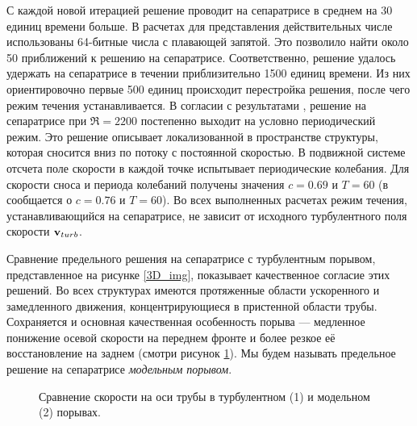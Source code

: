 С каждой новой итерацией решение проводит на сепаратрисе в среднем на 30 единиц времени больше. В расчетах для представления действительных числе использованы 64-битные числа с плавающей запятой. Это позволило найти около 50 приближений к решению на сепаратрисе. Соответственно, решение удалось удержать на сепаратрисе в течении приблизительно 1500 единиц времени. Из них ориентировочно первые 500 единиц происходит перестройка решения, после чего режим течения устанавливается. В согласии с результатами \cite{Avila2013}, решение на сепаратрисе при $\Re=2200$ постепенно выходит на условно периодический режим. Это решение описывает локализованной в пространстве структуры, которая сносится вниз по потоку с постоянной скоростью. В подвижной системе отсчета поле скорости в каждой точке испытывает периодические колебания. Для скорости сноса и периода колебаний получены значения $c=0.69$ и $T=60$ (в \cite{Avila2013} сообщается о $c=0.76$ и $T=60$). Во всех выполненных расчетах режим течения, устанавливающийся на сепаратрисе, не зависит от исходного турбулентного поля скорости $\mathbf{v}_{turb}$. 

\begin{comment}
Так как скорость сноса модельного порыва заранее не известна, решение на сепаратрисе было найдено в системе отсчета, двигающейся со скоростью $0.5$. После того, как решение на сепаратрисе найдено, изменить скорость перемещения системы отсчета уже не представляется возможным вследствие высокой чувствительности решения к возмущениям, возникающим в данном случае в результате неточностей численного интегрирования. Чтобы получить решение в сопутствующей системе отсчета, метод поиска решения на сепаратрисе применен повторно в системе отсчета, двигающейся с уже известной скоростью перемещения порыва. 
\end{comment}

Сравнение предельного решения на сепаратрисе с турбулентным порывом, представленное на рисунке \ref{3D_img}, показывает качественное согласие этих решений. Во всех структурах имеются протяженные области ускоренного и замедленного движения, концентрирующиеся в пристенной области трубы. Сохраняется и основная качественная особенность порыва --- медленное понижение осевой скорости на переднем фронте и более резкое её восстановление на заднем (смотри рисунок \ref{ucl_cmp_img}). Мы будем называть предельное решение на сепаратрисе {\it модельным порывом}.  

\begin{figure}
\caption{Сравнение скорости на оси трубы в турбулентном (1) и модельном (2) порывах.}
\label{ucl_cmp_img}
\end{figure}

